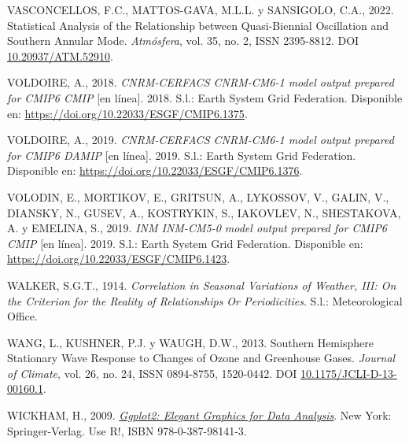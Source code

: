 \documentclass[12pt,oneside,a4paper]{reedthesis}
\newlength{\cslhangindent}
\newenvironment{CSLReferences}[2] %
 {%
  \setlength{\parindent}{0pt}
  \ifodd #1 \everypar{\setlength{\hangindent}{\cslhangindent}}\ignorespaces\fi
  \ifnum #2 > 0
  \setlength{\parskip}{#2\baselineskip}
  \fi
 }%
 {}
\begin{document}
\begin{CSLReferences}{1}{0}
\leavevmode{}%
VASCONCELLOS, F.C., MATTOS-GAVA, M.L.L. y SANSIGOLO, C.A., 2022. Statistical Analysis of the Relationship between {Quasi-Biennial Oscillation} and {Southern Annular Mode}. \emph{Atmósfera}, vol. 35, no. 2, ISSN 2395-8812. DOI \href{https://doi.org/10.20937/ATM.52910}{10.20937/ATM.52910}.

\leavevmode{}%
VOLDOIRE, A., 2018. \emph{CNRM-CERFACS CNRM-CM6-1 model output prepared for CMIP6 CMIP} {[}en línea{]}. 2018. S.l.: Earth System Grid Federation. Disponible en: \url{https://doi.org/10.22033/ESGF/CMIP6.1375}.

\leavevmode{}%
VOLDOIRE, A., 2019. \emph{CNRM-CERFACS CNRM-CM6-1 model output prepared for CMIP6 DAMIP} {[}en línea{]}. 2019. S.l.: Earth System Grid Federation. Disponible en: \url{https://doi.org/10.22033/ESGF/CMIP6.1376}.

\leavevmode{}%
VOLODIN, E., MORTIKOV, E., GRITSUN, A., LYKOSSOV, V., GALIN, V., DIANSKY, N., GUSEV, A., KOSTRYKIN, S., IAKOVLEV, N., SHESTAKOVA, A. y EMELINA, S., 2019. \emph{INM INM-CM5-0 model output prepared for CMIP6 CMIP} {[}en línea{]}. 2019. S.l.: Earth System Grid Federation. Disponible en: \url{https://doi.org/10.22033/ESGF/CMIP6.1423}.

\leavevmode{}%
WALKER, S.G.T., 1914. \emph{Correlation in {Seasonal Variations} of {Weather}, {III}: {On} the {Criterion} for the {Reality} of {Relationships Or Periodicities}}. S.l.: {Meteorological Office}.

\leavevmode{}%
WANG, L., KUSHNER, P.J. y WAUGH, D.W., 2013. Southern {Hemisphere Stationary Wave Response} to {Changes} of {Ozone} and {Greenhouse Gases}. \emph{Journal of Climate}, vol. 26, no. 24, ISSN 0894-8755, 1520-0442. DOI \href{https://doi.org/10.1175/JCLI-D-13-00160.1}{10.1175/JCLI-D-13-00160.1}.

\leavevmode{}%
WICKHAM, H., 2009. \emph{\href{https://doi.org/10.1007/978-0-387-98141-3}{Ggplot2: {Elegant Graphics} for {Data Analysis}}}. {New York}: {Springer-Verlag}. Use {R}!, ISBN 978-0-387-98141-3.


\end{CSLReferences}
\end{document}
